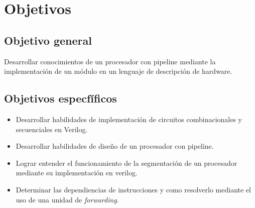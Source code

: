 \newpage
\section{Objetivos}

\subsection{Objetivo general}

Desarrollar conocimientos de un procesador con pipeline mediante la implementaci\'on de un m\'odulo en un lenguaje de descripci\'on de hardware.

\subsection{Objetivos especf\' ificos}
\begin{itemize}
\item Desarrollar habilidades de implementaci\'on de circuitos combinacionales y secuenciales en Verilog.
\item Desarrollar habilidades de dise\~no de un procesador con pipeline.
\item Lograr entender el funcionamiento de la segmentaci\' on de un procesador mediante su implementaci\' on en verilog.
\item Determinar las dependiencias de instrucciones y como resolverlo mediante el uso de una unidad de \textit{forwarding}.
\end{itemize}



